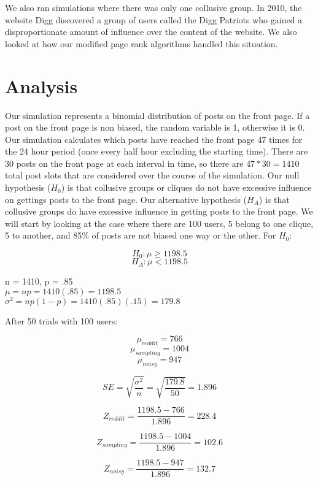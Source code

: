 \documentclass[12pt, oneside]{amsart}
\begin{document}
\vspace{.2cm}

We also ran simulations where there was only one collusive group.  In 2010, the website Digg discovered a group of users called the Digg Patriots who gained a disproportionate amount of influence over the content of the website.  We also looked at how our modified page rank algorithms handled this situation.

\section{Analysis}

Our simulation represents a binomial distribution of posts on the front page.  If a post on the front page is non biased, the random variable is 1, otherwise it is 0.  Our simulation calculates which posts have reached the front page 47 times for the 24 hour period (once every half hour excluding the starting time).  There are 30 posts on the front page at each interval in time, so there are $47 * 30 = 1410$ total post slots that are considered over the course of the simulation.  Our null hypothesis ($H_0$) is that collusive groups or cliques do not have excessive influence on gettings posts to the front page.  Our alternative hypothesis ($H_A$) is that collusive groups do have excessive influence in getting posts to the front page.  We will start by looking at the case where there are 100 users, 5 belong to one clique, 5 to another, and 85\% of posts are not biased one way or the other.  For $H_0$:

$$H_0: \mu \geq 1198.5$$
$$H_A: \mu < 1198.5$$

\begin{center}
n = 1410, p = .85 \\
$\mu = np = 1410 (.85) = 1198.5$ \\
$\sigma^2 = np(1 - p) = 1410 (.85)(.15) = 179.8$ \\
\end{center}

After 50 trials with 100 users:

$$\mu_{reddit} = 766$$
$$\mu_{sampling} = 1004$$
$$\mu_{noisy} = 947$$

$$SE = \sqrt{\frac{\sigma^2}{n}} = \sqrt{\frac{179.8}{50}} = 1.896$$

$$Z_{reddit} = \frac{1198.5 - 766}{1.896} = 228.4$$

$$Z_{sampling} = \frac{1198.5 - 1004}{1.896} = 102.6$$

$$Z_{noisy} = \frac{1198.5 - 947}{1.896} = 132.7$$
\end{document}
